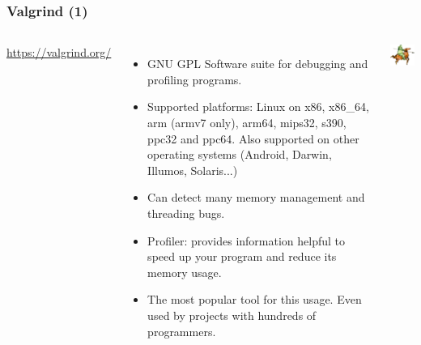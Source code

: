 \begin{frame}
  \frametitle{Valgrind (1)}
  \begin{columns}[T]
    \url{https://valgrind.org/}
    \begin{itemize}
    \item GNU GPL Software suite for debugging and profiling programs.
    \item Supported platforms: Linux on x86, x86\_64, arm (armv7 only),
      arm64, mips32, s390, ppc32 and ppc64. Also supported on other
      operating systems (Android, Darwin, Illumos, Solaris...)
    \item Can detect many memory management and threading bugs.
    \item Profiler: provides information helpful to speed up your
      program and reduce its memory usage.
    \item The most popular tool for this usage. Even used by projects
      with hundreds of programmers.
    \end{itemize}
    \includegraphics[width=\textwidth]{common/valgrind1.png}
  \end{columns}
\end{frame}

